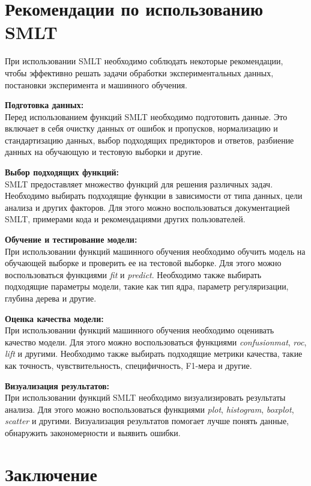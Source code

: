\documentclass[a4paper, 12pt]{article}%
\begin{document}
\begin{titlepage}
	\section{Рекомендации по использованию SMLT}
	
	При использовании SMLT необходимо соблюдать некоторые рекомендации, чтобы эффективно решать задачи обработки экспериментальных данных, постановки эксперимента и машинного обучения.
	
	\textbf{Подготовка данных:}\\
	Перед использованием функций SMLT необходимо подготовить данные. Это включает в себя очистку данных от ошибок и пропусков, нормализацию и стандартизацию данных, выбор подходящих предикторов и ответов, разбиение данных на обучающую и тестовую выборки и другие.
	
	\textbf{Выбор подходящих функций:}\\
	SMLT предоставляет множество функций для решения различных задач. Необходимо выбирать подходящие функции в зависимости от типа данных, цели анализа и других факторов. Для этого можно воспользоваться документацией SMLT, примерами кода и рекомендациями других пользователей.
	
	\textbf{Обучение и тестирование модели:}\\
	При использовании функций машинного обучения необходимо обучить модель на обучающей выборке и проверить ее на тестовой выборке. Для этого можно воспользоваться функциями \textit{fit} и \textit{predict}. Необходимо также выбирать подходящие параметры модели, такие как тип ядра, параметр регуляризации, глубина дерева и другие.
	
	\textbf{Оценка качества модели:}\\
	При использовании функций машинного обучения необходимо оценивать качество модели. Для этого можно воспользоваться функциями \textit{confusionmat}, \textit{roc}, \textit{lift} и другими. Необходимо также выбирать подходящие метрики качества, такие как точность, чувствительность, специфичность, F1-мера и другие.
	
	\textbf{Визуализация результатов:}\\
	При использовании функций SMLT необходимо визуализировать результаты анализа. Для этого можно воспользоваться функциями \textit{plot}, \textit{histogram}, \textit{boxplot}, \textit{scatter} и другими. Визуализация результатов помогает лучше понять данные, обнаружить закономерности и выявить ошибки.
	
	
	\section{Заключение}
	

\end{titlepage}
\end{document}
